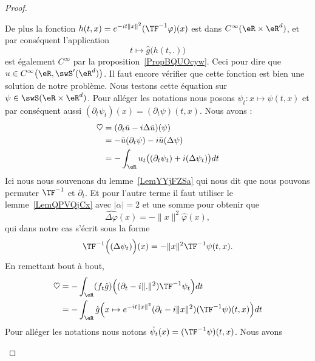 \begin{proof}
\begin{subproof}
		De plus la fonction \( h(t,x)= e^{-it\| x \|^2}(\TF^{-1}\varphi)(x)\) est dans \(  C^{\infty}(\eR\times \eR^d)\), et par conséquent l'application
		\begin{equation}
			t\mapsto \hat g\big( h(t,.) \big)
		\end{equation}
		est également \(  C^{\infty}\) par la proposition~\ref{PropBQUOcyw}. Ceci pour dire que \( u\in C^{\infty}\big( \eR,\swS'(\eR^d) \big)\). Il faut encore vérifier que cette fonction est bien une solution de notre problème. Nous testons cette équation sur \( \psi\in\swS(\eR\times\eR^d)\). Pour alléger les notations nous posons \( \psi_t\colon x\mapsto \psi(t,x)\) et par conséquent aussi \( (\partial_t\psi_t)(x)=(\partial_t\psi)(t,x)\). Nous avons :
		\begin{subequations}
			\begin{align}
				\heartsuit & =(\partial_t\tilde u-i\Delta\tilde u)(\psi)                     \\
				           & =-\tilde u(\partial_t\psi)-i\tilde u(\Delta\psi)                \\
				           & =-\int_{\eR}u_t\big( (\partial_t\psi_t)+i(\Delta\psi_t) \big)dt
			\end{align}
		\end{subequations}
		Ici nous nous souvenons du lemme~\ref{LemYYjFZSa} qui nous dit que nous pouvons permuter \( \TF^{-1}\) et \( \partial_t\). Et pour l'autre terme il faut utiliser le lemme~\ref{LemQPVQjCx} avec \( | \alpha |=2\) et une somme pour obtenir que
		\begin{equation}
			\widehat{\Delta\varphi}(x)=-\| x \|^2\hat\varphi(x),
		\end{equation}
		qui dans notre cas s'écrit sous la forme
		\begin{equation}
			\TF^{-1}\Big( (\Delta\psi_t) \Big)(x)=-\| x \|^2\TF^{-1}\psi(t,x).
		\end{equation}
		En remettant bout à bout,
		\begin{subequations}
			\begin{align}
				\heartsuit & =-\int_{\eR}(f_t\hat g)\Big( (\partial_t-i\| . \|^2)\TF^{-1}\psi_t \Big)dt                           \\
				           & =-\int_{\eR}\hat g\Big( x\mapsto  e^{-it\| x \|^2}(\partial_t-i\| x \|^2)(\TF^{-1}\psi)(t,x) \Big)dt
			\end{align}
		\end{subequations}
		Pour alléger les notations nous notons \( \check{\psi_t}(x)=(\TF^{-1}\psi)(t,x)\). Nous avons

\end{subproof}
\end{proof}
